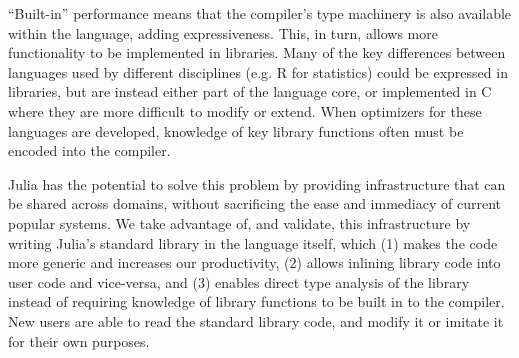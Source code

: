 \documentclass[9pt]{sigplanconf}
\begin{document}

``Built-in'' performance means that the compiler's type machinery is also
available within the language, adding expressiveness. This, in turn,
allows more functionality to be implemented in
libraries. Many of the key differences between languages used by different
disciplines (e.g. R for statistics) could be expressed in libraries, but
are instead either part of the language core, or implemented in C where
they are more difficult to modify or extend. When optimizers for these
languages are developed, knowledge of key library functions often must be
encoded into the compiler.


Julia has the potential to solve this problem by providing infrastructure
that can be shared across domains, without sacrificing the ease and
immediacy of current popular systems.
We take advantage of, and validate, this infrastructure by writing Julia's
standard library in the language itself, which (1) makes the code more
generic and increases our productivity, (2) allows inlining library
code into user code and vice-versa, and (3) enables direct type analysis
of the library instead of requiring knowledge of library functions to
be built in to the compiler. New users are able to read the standard
library code, and modify it or imitate it for their own purposes.


\end{document}
